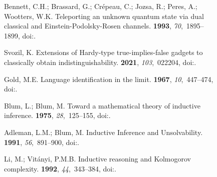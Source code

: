 \documentclass[entropy,article,accept,oneauthor,pdftex]{Definitions/mdpi}
\begin{document}
\begin{figure}[H]
\begin{thebibliography}{999}
Bennett, C.H.; Brassard, G.; Cr{\'{e}}peau, C.; Jozsa, R.; Peres, A.; Wootters,
  W.K.
\newblock Teleporting an unknown quantum state via dual classical and
  {E}instein-{P}odolsky-{R}osen channels.
 {\bf 1993}, {\em 70},~1895--1899, doi:{\href{https://doi.org/10.1103/PhysRevLett.70.1895}{}}.

Svozil, K.
\newblock Extensions of {H}ardy-type true-implies-false gadgets to classically
  obtain indistinguishability.
 {\bf 2021}, {\em 103},~022204, doi:{\href{https://doi.org/10.1103/PhysRevA.103.022204}{}}.

Gold, M.E.
\newblock Language identification in the limit.
 {\bf 1967}, {\em 10},~447--474, doi:{\href{https://doi.org/10.1016/S0019-9958(67)91165-5}{}}.

Blum, L.; Blum, M.
\newblock Toward a mathematical theory of inductive inference.
 {\bf 1975}, {\em 28},~125--155, doi:{\href{https://doi.org/10.1016/S0019-9958(75)90261-2}{}}.


Adleman, L.M.; Blum, M.
\newblock Inductive Inference and Unsolvability.
 {\bf 1991}, {\em 56},~891--900, doi:{\href{https://doi.org/10.2307/2275058}{}}.

Li, M.; Vit{\'{a}}nyi, P.M.B.
\newblock Inductive reasoning and {K}olmogorov complexity.
 {\bf 1992}, {\em 44},~343--384, doi:{\href{https://doi.org/10.1016/0022-0000(92)90026-F}{}}.


\end{thebibliography}
\end{figure}
\end{document}
